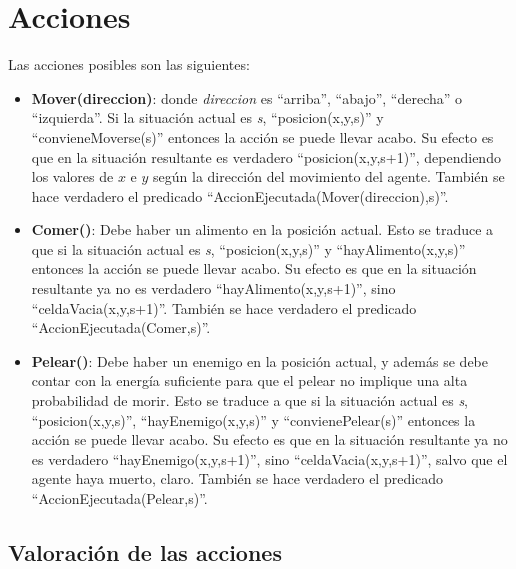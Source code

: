 \section{Acciones}

Las acciones posibles son las siguientes:


\begin{itemize}

\item \textbf{Mover(direccion)}: donde \emph{direccion} es ``arriba'',
``abajo'', ``derecha'' o ``izquierda''. Si la situación actual es \emph{s},
``posicion(x,y,s)'' y ``convieneMoverse(s)'' entonces la acción se puede llevar
acabo. Su efecto es que en la situación resultante es verdadero
``posicion(x,y,s+1)'', dependiendo los valores de $x$ e $y$ según la dirección
del movimiento del agente. También se hace verdadero el predicado ``AccionEjecutada(Mover(direccion),s)''.

\item \textbf{Comer()}: Debe haber un alimento en la posición actual. Esto se
traduce a que si la situación actual es \emph{s}, ``posicion(x,y,s)'' y
``hayAlimento(x,y,s)'' entonces la acción se puede llevar acabo. Su efecto es
que en la situación resultante ya no es verdadero ``hayAlimento(x,y,s+1)'',
sino ``celdaVacia(x,y,s+1)''. También se hace verdadero el predicado ``AccionEjecutada(Comer,s)''.

\item \textbf{Pelear()}: Debe haber un enemigo en la posición actual, y además
se debe contar con la energía suficiente para que el pelear no implique una
alta probabilidad de morir. Esto se traduce a que si la situación actual es
\emph{s}, ``posicion(x,y,s)'', ``hayEnemigo(x,y,s)'' y ``convienePelear(s)''
entonces la acción se puede llevar acabo. Su efecto es que en la situación
resultante ya no es verdadero ``hayEnemigo(x,y,s+1)'', sino
``celdaVacia(x,y,s+1)'', salvo que el agente haya muerto, claro. También se hace verdadero el predicado ``AccionEjecutada(Pelear,s)''.

\end{itemize}

\subsection{Valoración de las acciones}

